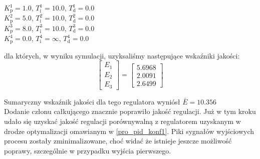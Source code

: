 \begin{center}
    $K^{\num{1}}_{\mathrm{p}} = \num{1.0}$, $T^{\num{1}}_{\mathrm{i}} = \num{10.0}$, $T^{\num{1}}_{\mathrm{d}} = \num{0.0}$ \\
    $K^{\num{2}}_{\mathrm{p}} = \num{5.0}$, $T^{\num{2}}_{\mathrm{i}} = \num{10.0}$, $T^{\num{2}}_{\mathrm{d}} = \num{0.0}$ \\
    $K^{\num{3}}_{\mathrm{p}} = \num{8.0}$, $T^{\num{3}}_{\mathrm{i}} = \num{10.0}$, $T^{\num{3}}_{\mathrm{d}} = \num{0.0}$ \\
    $K^{\num{4}}_{\mathrm{p}} = \num{0.0}$, $T^{\num{4}}_{\mathrm{i}} = \infty$, $T^{\num{4}}_{\mathrm{d}} = \num{0.0}$ \\
\end{center}

dla których, w wyniku symulacji, uzyksaliśmy następujące wskaźniki jakości:\\

\[
\begin{bmatrix}
    E_{\mathrm{1}} \\
    E_{\mathrm{2}} \\
    E_{\mathrm{3}} 
\end{bmatrix}
= 
\begin{bmatrix}
    \num{5.6968} \\
    \num{2.0091} \\
    \num{2.6499}
\end{bmatrix}
\]

Sumaryczny wskaźnik jakości dla tego regulatora wyniósł $\bar{E} = \num{10.356}$\\

Dodanie członu całkującego znacznie poprawiło jakość regulacji. Już w tym kroku udało się 
uzyskać jakość regulacji porównywalną z regulatorem uzyskanym w drodze 
optymalizacji omawianym w \ref{pro_pid_konf1}. Piki sygnałów wyjściowych procesu zostały 
zminimalizowane, choć widać że istnieje jeszcze możliwość poprawy, szczególnie w przypadku
wyjścia pierwszego.


